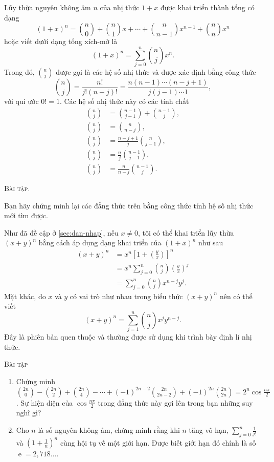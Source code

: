 \documentclass[12pt]{article} %
\newcounter{baitap} %
\newenvironment{baitap}[1][]{%
    \vspace{10pt} %
    \noindent\textsc{Bài tập #1} %
    \noindent
}{%
    \par
    \vspace{10pt} %
}
\newenvironment{baitapcham}[1][]{%
    \vspace{10pt} %
    \noindent\textsc{Bài tập. #1} %
    \noindent
}{%
    \par
    \vspace{10pt} %
}
\begin{document}
Lũy thừa nguyên không âm \(n\) của nhị thức \(1+x\) được khai triển thành tổng có dạng 
\[(1+x)^n=\binom{n}{0}+\binom{n}{1}x+\cdots+\binom{n}{n-1}x^{n-1}+\binom{n}{n}x^n\]
hoặc viết dưới dạng tổng xích-mờ là
\[(1+x)^n=\sum_{j=0}^n\binom{n}{j}x^n.\]
Trong đó, \(\binom{n}{j}\) được gọi là các hệ số nhị thức và được xác định bằng công thức 
\[\binom{n}{j}=\frac{n!}{j!(n-j)!}=\frac{n(n-1)\cdots(n-j+1)}{j(j-1)\cdots 1},\]
với qui ước \(0!=1\). Các hệ số nhị thức này có các tính chất
\begin{align*}
    \binom{n}{j}&=\binom{n-1}{j-1}+\binom{n-1}{j}, \\
    \binom{n}{j}&=\binom{n}{n-j}, \\
    \binom{n}{j}&=\frac{n-j+1}{j}\binom{n}{j-1},\\
    \binom{n}{j}&=\frac{n}{j}\binom{n-1}{j-1}, \\
    \binom{n}{j}&=\frac{n}{n-j}\binom{n-1}{j}.
\end{align*}

\begin{baitapcham}
    Bạn hãy chứng minh lại các đẳng thức trên bằng công thức tính hệ số nhị thức mới tìm được.
\end{baitapcham}

Như đã đề cập ở \autoref{sec:dan-nhap}, nếu \(x\ne 0\), tôi có thể khai triển lũy thừa \((x+y)^n\) bằng cách áp dụng dạng khai triển của \((1+x)^n\) như sau
\begin{align*}
    (x+y)^n 
        &= x^n\left[1+\left(\frac{y}{x}\right)\right]^n \\
        &= x^n\sum_{j=0}^n \binom{n}{j}\left(\frac{y}{x}\right)^j \\
        &=\sum_{j=0}^n\binom{n}{j}x^{n-j}y^j.
\end{align*}
Mặt khác, do \(x\) và \(y\) có vai trò như nhau trong biểu thức \((x+y)^n\) nên có thể viết
\[(x+y)^n=\sum_{j=1}^n\binom{n}{j}x^jy^{n-j}.\]
Đây là phiên bản quen thuộc và thường được sử dụng khi trình bày định lí nhị thức.

\begin{baitap}
    \begin{enumerate}
        \item Chứng minh \(\binom{2n}{0}-\binom{2n}{2}+\binom{2n}{4}-\cdots +(-1)^{2n-2}\binom{2n}{2n-2}+(-1)^{2n}\binom{2n}{2n}=2^n\cos{\frac{n\pi}{2}}\). Sự hiện diện của \(\cos{\frac{n\pi}{2}}\) trong đẳng thức này gợi lên trong bạn những suy nghĩ gì? 
        \item Cho \(n\) là số nguyên không âm, chứng minh rằng khi \(n\) tăng vô hạn, \(\sum_{j=0}^n\frac{1}{j!}\) và \(\left(1+\frac{1}{n}\right)^n\) cùng hội tụ về một giới hạn. Được biết giới hạn đó chính là số \(\operatorname{e}=2,718\ldots\).
    \end{enumerate}
\end{baitap}


\printbibliography
\end{document}
